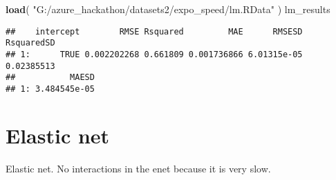 \documentclass[]{article}
\newenvironment{Shaded}{\begin{snugshade}}{\end{snugshade}}
\newcommand{\DataTypeTok}[1]{\textcolor[rgb]{0.13,0.29,0.53}{#1}}
\newcommand{\KeywordTok}[1]{\textcolor[rgb]{0.13,0.29,0.53}{\textbf{#1}}}
\newcommand{\NormalTok}[1]{#1}
\newcommand{\OperatorTok}[1]{\textcolor[rgb]{0.81,0.36,0.00}{\textbf{#1}}}
\newcommand{\StringTok}[1]{\textcolor[rgb]{0.31,0.60,0.02}{#1}}
\begin{document}
\begin{Shaded}
\end{Shaded}

\begin{Shaded}
\begin{Highlighting}[]
\KeywordTok{load}\NormalTok{( }\StringTok{"G:/azure_hackathon/datasets2/expo_speed/lm.RData"}\NormalTok{ )}
\NormalTok{lm_results}
\end{Highlighting}
\end{Shaded}

\begin{verbatim}
##    intercept        RMSE Rsquared         MAE      RMSESD RsquaredSD
## 1:      TRUE 0.002202268 0.661809 0.001736866 6.01315e-05 0.02385513
##           MAESD
## 1: 3.484545e-05
\end{verbatim}

\hypertarget{elastic-net}{%
\section{Elastic net}\label{elastic-net}}

Elastic net. No interactions in the enet because it is very slow.
\end{document}

